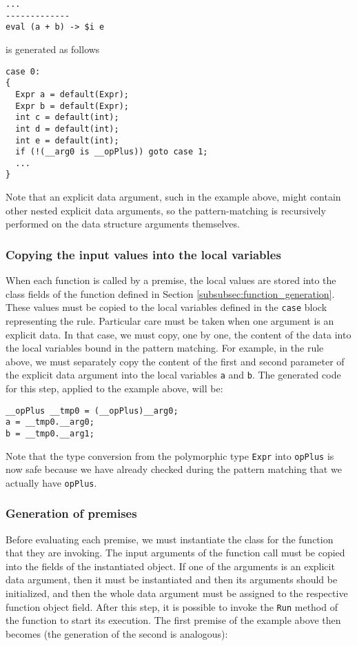 \begin{lstlisting}
...
-------------
eval (a + b) -> $i e
\end{lstlisting}

\noindent
is generated as follows

\begin{lstlisting}
case 0:
{
  Expr a = default(Expr);
  Expr b = default(Expr);
  int c = default(int);
  int d = default(int);
  int e = default(int);
  if (!(__arg0 is __opPlus)) goto case 1;
  ...
}
\end{lstlisting}

\noindent
Note that an explicit data argument, such in the example above, might contain other nested explicit data arguments, so the pattern-matching is recursively performed on the data structure arguments themselves.

\subsubsection{Copying the input values into the local variables}
When each function is called by a premise, the local values are stored into the class fields of the function defined in Section \ref{subsubsec:function_generation}. These values must be copied to the local variables defined in the \texttt{case} block representing the rule. Particular care must be taken when one argument is an explicit data. In that case, we must copy, one by one, the content of the data into the local variables bound in the pattern matching. For example, in the rule above, we must separately copy the content of the first and second parameter of the explicit data argument into the local variables \texttt{a} and \texttt{b}. The generated code for this step, applied to the example above, will be:

\begin{lstlisting}
__opPlus __tmp0 = (__opPlus)__arg0;
a = __tmp0.__arg0;
b = __tmp0.__arg1;
\end{lstlisting}

Note that the type conversion from the polymorphic type \texttt{Expr} into \texttt{\tu\tu opPlus} is now safe because we have already checked during the pattern matching that we actually have \texttt{\tu\tu opPlus}.

\subsubsection{Generation of premises}
Before evaluating each premise, we must instantiate the class for the function that they are invoking. The input arguments of the function call must be copied into the fields of the instantiated object. If one of the arguments is an explicit data argument, then it must be instantiated and then its arguments should be initialized, and then the whole data argument must be assigned to the respective function object field. After this step, it is possible to invoke the \texttt{Run} method of the function to start its execution. The first premise of the example above then becomes (the generation of the second is analogous):

